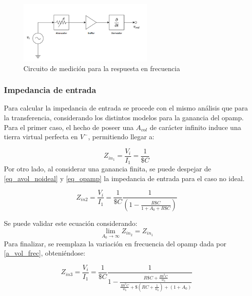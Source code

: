 \begin{figure}[H]
    \centering
    \includegraphics[width=0.6\textwidth]{../Ejercicio3-CircuitoIntegradoresyDerivadores/Imagenes/Derivador/circuito_medidor.png}
    \caption{Circuito de medición para la respuesta en frecuencia}
    \label{circuito_medidor_derivador}
\end{figure}



\subsubsection{Impedancia de entrada}

Para calcular la impedancia de entrada se procede con el mismo análisis que para 
la transferencia, considerando los distintos modelos para la ganancia del opamp. Para el primer 
caso, el hecho de poseer una $A_{vol}$ de carácter infinito induce una tierra virtual 
perfecta en $V^-$, permitiendo llegar a:

\vspace{2mm}
\begin{equation}
   Z_{in_1}=\frac{V_i}{I_1}=\frac{1}{\$C} 
    \label{zin_ideal}
\end{equation}
\vspace{2mm}
Por otro lado, al considerar una ganancia finita, se puede despejar de \ref{eq_avol_noideal} y \ref{eq_opamp}
la impedancia de entrada para el caso no ideal.

\vspace{2mm}
\begin{equation}
    Z_{in2}=\frac{V_i}{I_1}=\frac{1}{\$C}\frac{1}{\left(1-\frac{R\$C}{1+A_0+R\$C}\right)} 
    \label{zin_avol_ideal}
\end{equation}
\vspace{2mm}

Se puede validar este ecuación considerando:
 $$\lim_{A_0\to\infty} Z_{in_2}=Z_{in_1}$$
Para finalizar, se reemplaza la variación en frecuencia del opamp dada por \ref{a_vol_frec}, obteniéndose:

\vspace{2mm}
\begin{equation}
    Z_{in3}=\frac{V_i}{I_1}=\frac{1}{\$C}\frac{1}{1-\frac{R\$C+\frac{R\$^2C}{w_b}}{\frac{R\$^2C}{w_b} +\$(RC+\frac{1}{w_b})+(1+A_0)}} 
    \label{zin_avol_frec}
\end{equation}
\vspace{2mm}

